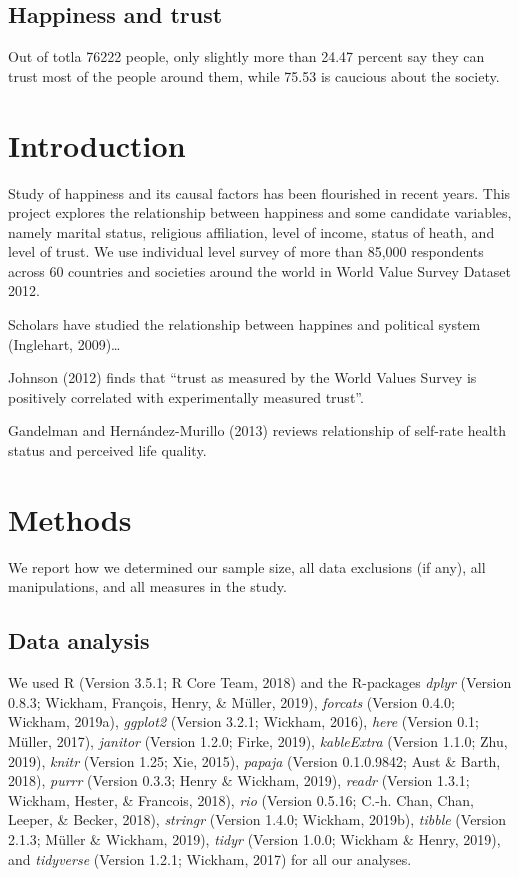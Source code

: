 \documentclass[man]{apa6}
\begin{document}
\subsection{Happiness and trust}\label{happiness-and-trust}

Out of totla 76222 people, only slightly more than 24.47 percent say
they can trust most of the people around them, while 75.53 is caucious
about the society.

\section{Introduction}\label{introduction}

Study of happiness and its causal factors has been flourished in recent
years. This project explores the relationship between happiness and some
candidate variables, namely marital status, religious affiliation, level
of income, status of heath, and level of trust. We use individual level
survey of more than 85,000 respondents across 60 countries and societies
around the world in World Value Survey Dataset 2012.

Scholars have studied the relationship between happines and political
system (Inglehart, 2009)\ldots{}

Johnson (2012) finds that \enquote{trust as measured by the World Values
Survey is positively correlated with experimentally measured trust}.

Gandelman and Hernández-Murillo (2013) reviews relationship of self-rate
health status and perceived life quality.

\section{Methods}\label{methods}

We report how we determined our sample size, all data exclusions (if
any), all manipulations, and all measures in the study.

\subsection{Data analysis}\label{data-analysis}

We used R (Version 3.5.1; R Core Team, 2018) and the R-packages
\emph{dplyr} (Version 0.8.3; Wickham, François, Henry, \& Müller, 2019),
\emph{forcats} (Version 0.4.0; Wickham, 2019a), \emph{ggplot2} (Version
3.2.1; Wickham, 2016), \emph{here} (Version 0.1; Müller, 2017),
\emph{janitor} (Version 1.2.0; Firke, 2019), \emph{kableExtra} (Version
1.1.0; Zhu, 2019), \emph{knitr} (Version 1.25; Xie, 2015), \emph{papaja}
(Version 0.1.0.9842; Aust \& Barth, 2018), \emph{purrr} (Version 0.3.3;
Henry \& Wickham, 2019), \emph{readr} (Version 1.3.1; Wickham, Hester,
\& Francois, 2018), \emph{rio} (Version 0.5.16; C.-h. Chan, Chan,
Leeper, \& Becker, 2018), \emph{stringr} (Version 1.4.0; Wickham,
2019b), \emph{tibble} (Version 2.1.3; Müller \& Wickham, 2019),
\emph{tidyr} (Version 1.0.0; Wickham \& Henry, 2019), and
\emph{tidyverse} (Version 1.2.1; Wickham, 2017) for all our analyses.
\end{document}
